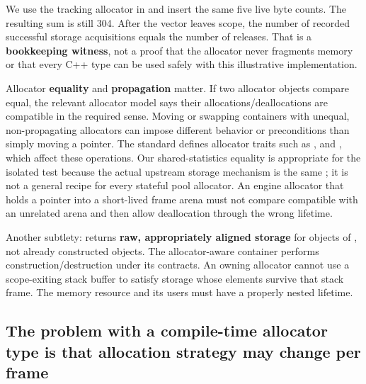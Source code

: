 We use the tracking allocator in  and insert the same five live byte counts. The resulting sum is still 304. After the vector leaves scope, the number of recorded successful storage acquisitions equals the number of releases. That is a \textbf{bookkeeping witness}, not a proof that the allocator never fragments memory or that every C++ type can be used safely with this illustrative implementation.

Allocator \textbf{equality} and \textbf{propagation} matter. If two allocator objects compare equal, the relevant allocator model says their allocations/deallocations are compatible in the required sense. Moving or swapping containers with unequal, non-propagating allocators can impose different behavior or preconditions than simply moving a pointer. The standard defines allocator traits such as ,  and , which affect these operations. Our shared-statistics equality is appropriate for the isolated test because the actual upstream storage mechanism is the same ; it is not a general recipe for every stateful pool allocator. An engine allocator that holds a pointer into a short-lived frame arena must not compare compatible with an unrelated arena and then allow deallocation through the wrong lifetime.

Another subtlety:  returns \textbf{raw, appropriately aligned storage} for  objects of , not  already constructed objects. The allocator-aware container performs construction/destruction under its contracts. An owning allocator cannot use a scope-exiting stack buffer to satisfy storage whose elements survive that stack frame. The memory resource and its users must have a properly nested lifetime.

\subsection{The problem with a compile-time allocator type is that allocation strategy may change per frame}\label{05-engine-i-ch006-the-problem-with-a-compile-time-allocator-type-is-that-allocation-strategy-may-change-per-frame}

\hypertarget{05-engine-i-ch006-the-problem-with-a-compile-time-allocator-type-is-that-allocation-strategy-may-change-per-frame}{}

